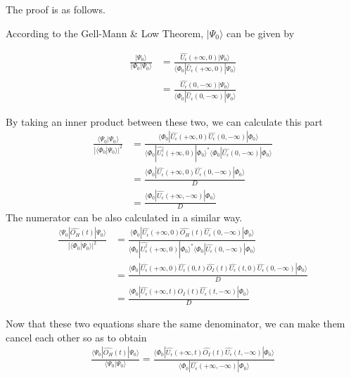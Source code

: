 The proof is as follows.

According to the Gell-Mann \& Low Theorem, $|\Psi_0\rangle$ can be given by

\begin{align}
\frac{|\Psi_0\rangle}{\langle\Phi_0|\Psi_0\rangle}&=\frac{\hat{U_{\epsilon}}(+\infty,0)|\Psi_0\rangle}{\langle\Phi_0|\hat U_{\epsilon}(+\infty,0)|\Psi_0\rangle} \nonumber \\
&=\frac{\hat{U_{\epsilon}}(0,-\infty)|\Psi_0\rangle}{\langle\Phi_0|\hat U_{\epsilon}(0,-\infty)|\Psi_0\rangle} \nonumber
\end{align}

By taking an inner product between these two, we can calculate this part
\begin{align}
\frac{\langle\Psi_0|\Psi_0\rangle}{|\langle\Phi_0|\Psi_0\rangle|^2}&=\frac{\langle\Phi_0|\hat{U_{\epsilon}}(+\infty,0)\hat{U_{\epsilon}}(0,-\infty)|\Phi_0\rangle}{\langle\Phi_0|\hat{U^{\dagger}_{\epsilon}}(+\infty,0)|\Phi_0\rangle^*\langle\Phi_0|\hat{U_{\epsilon}}(0,-\infty)|\Phi_0\rangle} \nonumber \\
&=\frac{\langle\Phi_0|\hat{U_{\epsilon}}(+\infty,0)\hat{U_{\epsilon}}(0,-\infty)|\Phi_0\rangle}{D} \nonumber \\
&= \frac{\langle\Phi_0|\hat{U_{\epsilon}}(+\infty,-\infty)|\Phi_0\rangle}{D} \nonumber
\end{align}
The numerator can be also calculated in a similar way.
\begin{align}
\frac{\langle\Psi_0|\hat{O_H}(t)|\Psi_0\rangle}{|\langle\Phi_0|\Psi_0\rangle|^2}&=\frac{\langle\Phi_0|\hat{U_{\epsilon}}(+\infty,0)\hat{O_H}(t)\hat{U_{\epsilon}}(0,-\infty)|\Phi_0\rangle}{\langle\Phi_0|\hat{U^{\dagger}_{\epsilon}}(+\infty,0)|\Phi_0\rangle^*\langle\Phi_0|\hat{U_{\epsilon}}(0,-\infty)|\Phi_0\rangle} \nonumber \\
&=\frac{\langle\Phi_0|\hat{U_{\epsilon}}(+\infty,0)\hat{U_{\epsilon}}(0,t)\hat{O_I}(t)\hat{U_{\epsilon}}(t,0)\hat{U_{\epsilon}}(0,-\infty)|\Phi_0\rangle}{D} \nonumber \\
&=\frac{\langle\Phi_0|\hat{U_{\epsilon}}(+\infty,t)\hat{O_I}(t)\hat{U_{\epsilon}}(t,-\infty)|\Phi_0\rangle}{D} \nonumber
\end{align}


Now that these two equations share the same denominator, we can make them cancel each other so as to obtain
\begin{align}
\frac{\langle\Psi_0|\hat{O_H}(t)|\Psi_0\rangle}{\langle\Psi_0|\Psi_0\rangle}=\frac{\langle\Phi_0|\hat{U_{\epsilon}}(+\infty,t)\hat{O_I}(t)\hat{U_{\epsilon}}(t,-\infty)|\Phi_0\rangle}{\langle\Phi_0|\hat{U_{\epsilon}}(+\infty,-\infty)|\Phi_0\rangle}\nonumber
\end{align}

